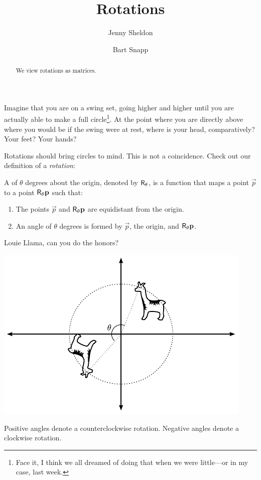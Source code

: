 \documentclass{ximera}
\author{Jenny Sheldon \and Bart Snapp}
\title{Rotations}
\begin{document}
\begin{abstract}
  We view rotations as matrices.
\end{abstract}
\maketitle

Imagine that you are on a swing set, going higher and higher until you
are actually able to make a full circle\footnote{Face it, I think we
  all dreamed of doing that when we were little---or in my case, last
  week.}. At the point where you are directly above where you would be
if the swing were at rest, where is your head, comparatively?  Your
feet?  Your hands?


Rotations should bring circles to mind. This is not a
coincidence. Check out our definition of a \textit{rotation}:

\begin{definition}
A  of $\theta$ degrees about the origin, denoted by
$\mathsf{R}_\theta$, is a function that maps a point $\vec{p}$ to a point
$\mathsf{R}_\theta \mathbf{p}$ such that:
\begin{enumerate}
\item The points $\vec{p}$ and $\mathsf{R}_\theta \mathbf{p}$ are equidistant
  from the origin.
\item An angle of $\theta$ degrees is formed by $\vec{p}$, the origin, and
  $\mathsf{R}_\theta\mathbf{p}$.
\end{enumerate}
Louie Llama, can you do the honors?
\end{definition}
\begin{image}
\includegraphics{rotIdeaEg.pdf}
\end{image}
\begin{warning} 
Positive angles denote a counterclockwise rotation. Negative angles
denote a clockwise rotation.
\end{warning}
\end{document}
